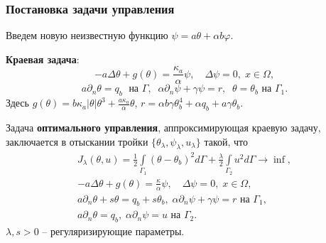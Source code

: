 \begin{frame}
    \frametitle{Постановка задачи управления}
    Введем новую неизвестную функцию
    $\psi= a\theta + \alpha b \varphi$.

    \textbf{Краевая задача}:
    \begin{equation}
        \label{eq:2_4:eq2}
        - a \Delta \theta + g (\theta) = \frac{\kappa_a}{\alpha}\psi, \quad
        \Delta \psi = 0, \; x \in \Omega,
    \end{equation}
    \begin{equation}
        \label{eq:2_4:bc3}
        a \partial_n \theta = q_b \; \text{ на }\Gamma, \;\;
        \alpha \partial_n \psi + \gamma \psi  =  r,\;\;
        \theta = \theta_b  \text{ на }\Gamma_1.
    \end{equation}
    Здесь $g(\theta) = b \kappa_a|\theta|\theta^3 + \frac{a\kappa_a}{\alpha}\theta$, $r=\alpha b \gamma \theta_b^4+ \alpha q_b + a \gamma \theta_b$.


    Задача \textbf{оптимального управления}, аппроксимирующая краевую задачу,
    заключается в отыскании тройки $\{\theta_\lambda,\psi_\lambda,u_\lambda\}$ такой, что
    \begin{gather}
        \label{eq:2_4:cost}
        J_\lambda(\theta, u) =
        \frac{1}{2} \int \limits_{\Gamma_1} (\theta - \theta_b)^2 d \Gamma
        + \frac{\lambda}{2}\int\limits_{\Gamma_2} u^2 d\Gamma \rightarrow \inf, \\
        - a \Delta \theta + g (\theta) = \frac{\kappa}{\alpha}\psi, \quad
        \Delta \psi = 0, \; x \in \Omega, \\
        a \partial_n \theta + s \theta = q_b + s \theta_b,
        \; \alpha \partial_n \psi + \gamma \psi = r
        \text{ на } \Gamma_1,\\
        a \partial_n \theta = q_b, \;
        \alpha \partial_n \psi = u \text{ на } \Gamma_2.
    \end{gather}
    $\lambda, s > 0$ -- регуляризирующие параметры.

\end{frame}

